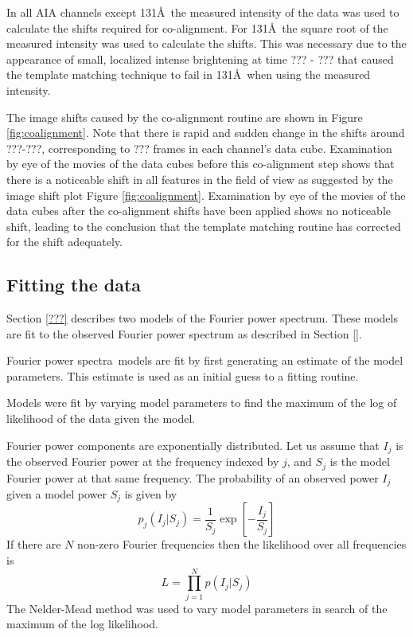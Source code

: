 \documentclass[onecolumn]{emulateapj}
\newcommand{\PA}{power spectra}
\newcommand{\Fpa}{Fourier \PA}
\begin{document}
In all AIA channels except 131\AA\ the measured intensity of the data
was used to calculate the shifts required for co-alignment.  For
131\AA\ the square root of the measured intensity was used to
calculate the shifts.  This was necessary due to the appearance of
small, localized intense brightening at time ??? - ??? that caused the
template matching technique to fail in 131\AA\ when using the measured
intensity.

The image shifts caused by the co-alignment routine are shown in
Figure \ref{fig:coalignment}.  Note that there is rapid and sudden
change in the shifts around ???-???, corresponding to ??? frames in
each channel's data cube.  Examination by eye of the movies of the
data cubes before this co-alignment step shows that there is a
noticeable shift in all features in the field of view as suggested by
the image shift plot Figure \ref{fig:coalignment}.  Examination by eye
of the movies of the data cubes after the co-alignment shifts have
been applied shows no noticeable shift, leading to the conclusion that
the template matching routine has corrected for the shift adequately.

\subsection{Fitting the data}\label{sec:app:fit}
Section \ref{???} describes two models of the Fourier power spectrum.
These models are fit to the observed Fourier power spectrum as
described in Section \ref{}.

\Fpa\ models are fit by first generating an estimate of the model
parameters.  This estimate is used as an initial guess to a fitting
routine.  



Models were fit by varying model parameters to find the
maximum of the log of likelihood of the data given the model.  

Fourier power components are exponentially distributed.  Let us assume
that $I_{j}$ is the observed Fourier power at the frequency indexed by
$j$, and $S_{j}$ is the model Fourier power at that same frequency.
The probability of an observed power $I_{j}$ given a model power
$S_{j}$ is given by
\begin{equation}
p_{j}\left(I_{j}|S_{j}\right) =
\frac{1}{S_{j}}\exp\left[-\frac{I_{j}}{S_{j}}\right]
\label{eqn:freqprob}
\end{equation}
If there are $N$ non-zero Fourier frequencies then the likelihood over
all frequencies is
\begin{equation}
L=\prod_{j=1}^{N}p\left(I_{j}|S_{j}\right)
\label{eqn:freqprob:all}
\end{equation}
The
Nelder-Mead method was used to vary model parameters in search of the
maximum of the log likelihood.  
\end{document}
